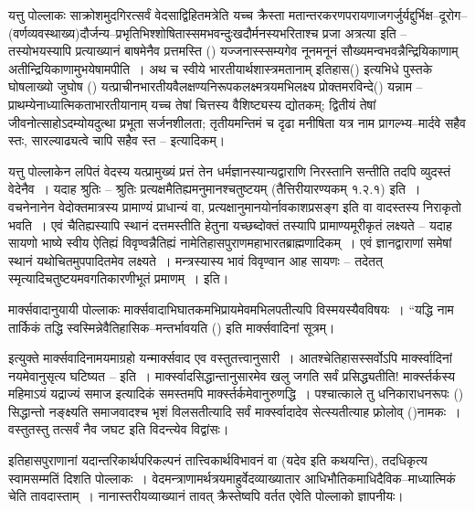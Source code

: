 यत्तु पोल्लाकः साक्रोशमुदगिरत्सर्वं वेदसाद्विहितमत्रेति यच्च क्रैस्ता मतान्तरकरणपरायणा\break जगर्जुर्यद्दुर्भिक्ष–दूरोग–(वर्णव्यवस्थाख्य)दौर्जन्य–प्रभृतिभिश्शोषितास्समभवन्दुःखदौर्मनस्यभरि\-ताश्च प्रजा अत्रत्या इति – तस्योभयस्यापि प्रत्याख्यानं बाषमेनैव प्रत्तमस्ति () यज्जनास्स्सम्यगेव नूनमनूनं सौख्यमन्वभवन्नैन्द्रियिकाणाम् अतीन्द्रियिकाणामुभयेषामपीति~। अथ च स्वीये भारतीयार्थशास्त्रमतानाम् इतिहास() इत्यभिधे पुस्तके घोषलाख्यो जुघोष () यत्प्राचीनभारतीयवैलक्षण्य\-निरूपकलक्ष्मत्रयमभिलक्ष्य प्रोक्तमरविन्दे() यन्नाम – प्राथम्येनाध्यात्मिकता\break भारतीयानाम् यच्च तेषां चित्तस्य वैशिष्ट्यस्य द्योतकम्; द्वितीयं तेषां जीवनोत्साहोऽदम्यो\break यदुत्था प्रभूता सर्जनशीलता; तृतीयमन्तिमं च दृढा मनीषिता यत्र नाम प्रागल्भ्य–मार्दवे सहैव स्तः, सारल्याढ्यत्वे चापि सहैव स्त – इत्यादिकम्।

यत्तु पोल्लाकेन लपितं वेदस्य यत्प्रामुख्यं प्रत्तं तेन धर्मज्ञानस्यान्यद्वाराणि निरस्तानि सन्तीति तदपि व्युदस्तं वेदेनैव~। यदाह श्रुतिः – श्रुतिः प्रत्यक्षमैतिह्यमनुमानश्चतुष्टयम् (तैत्तिरीयारण्यकम् १.२.१) इति~। वचनेनानेन वेदोक्तमात्रस्य प्रामाण्यं प्राधान्यं वा, प्रत्यक्षानुमानयोर्नावकाशप्रसङ्ग इति वा वादस्तस्य निराकृतो भवति~। एवं चैतिह्यस्यापि स्थानं दत्तमस्तीति हेतुना यच्छब्दोक्तं तस्यापि प्रामाण्यमूरीकृतं लक्ष्यते – यदाह सायणो भाष्ये स्वीय ऐतिह्यं विवृण्वन्नैतिह्यं नामेतिहासपुराणमहाभारतब्राह्मणादिकम्~। एवं ज्ञानद्वाराणां समेषां स्थानं यथोचितमुपपादितमेव लक्ष्यते~। मन्त्रस्यास्य भावं विवृण्वान आह सायणः – तदेतत् स्मृत्यादिचतुष्टयमवगतिकारणीभूतं प्रमाणम्~। इति।

मार्क्सवादानुयायी पोल्लाकः मार्क्सवादाभिघातकमभिप्रायमेवमभिलपतीत्यपि विस्मयस्यैव\break विषयः~। “यद्धि नाम तार्किकं तद्धि स्वस्मिन्नेवैतिहासिक–मन्तर्भावयति () इति मार्क्सवादिनां सूत्रम्।

इत्युक्ते मार्क्सवादिनामयमाग्रहो यन्मार्क्सवाद एव वस्तुतत्त्वानुसारी~। आतश्चेतिहासस्सर्वोऽपि मार्क्स्वादिनां नयमेवानुसृत्य घटिष्यत – इति~। मार्क्स्वादसिद्धान्तानुसारमेव खलु जगति सर्वं प्रसिद्ध्यतीति! मार्क्स्तर्कस्य महिमाऽयं यद्राज्यं समाज इत्यादिकं समस्तमपि मार्क्स्तर्कमेवानुरुणद्धि~। पश्चात्काले तु धनिकाराधनरूपः () सिद्धान्तो नङ्क्ष्यति समाजवादश्च भृशं विलसतीत्यादि सर्वं मार्क्स्वादादेव सेत्स्यतीत्याह फ्रोलोव् ()नामकः~। वस्तुतस्तु तत्सर्वं नैव जघट इति विदन्त्येव विद्वांसः।

इतिहासपुराणानां यदान्तरिकार्थपरिकल्पनं तात्त्विकार्थविभावनं वा (यदेव  इति कथयन्ति), तदधिकृत्य स्वामसम्मतिं दिशति पोल्लाकः~। वेदमन्त्राणामर्थत्रयमाहुर्वेदव्याख्यातार आधिभौतिकमाधिदैविक–माध्यात्मिकं चेति तावदास्ताम्~। नानास्तरीयव्याख्यानं तावत् क्रैस्तेष्वपि वर्तत एवेति पोल्लाको ज्ञापनीयः।

